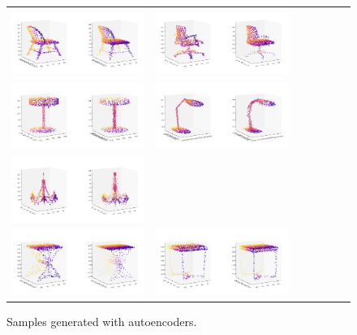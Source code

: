 \documentclass[12pt]{article}
\begin{document}
    \begin{figure}
        \centering
        \begin{tabular}{lllllll}
            \includegraphics[width = 60mm]{chair_ae_1} &
            \includegraphics[width = 60mm]{chair_ae_2} \\
            \includegraphics[width = 60mm]{lamp_ae_1} &
            \includegraphics[width = 60mm]{lamp_ae_2} \\
            \includegraphics[width = 60mm]{lamp_ae_3} \\
            \includegraphics[width = 60mm]{table_ae_1} &
            \includegraphics[width = 60mm]{table_ae_2} \\
        \end{tabular}
        \caption{Samples generated with autoencoders.}
        \label{figure:samples_generated_with_autoencoders}
    \end{figure}
\end{document}
